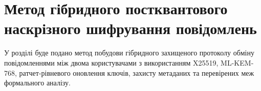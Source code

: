 \chapter{Метод гібридного постквантового наскрізного шифрування повідомлень}

У розділі буде подано метод побудови гібридного захищеного протоколу обміну повідомленнями між двома користувачами з використанням X25519, ML-KEM-768, ратчет-рівневого оновлення ключів, захисту метаданих та перевірених меж формального аналізу.
